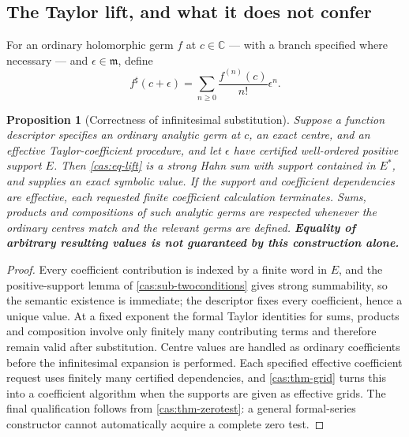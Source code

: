 \documentclass[11pt,letterpaper]{article}
\numberwithin{equation}{section}
\newtheorem{proposition}[theorem]{Proposition}
\theoremstyle{definition}
\theoremstyle{remark}
\newcommand{\C}{\mathbb C}
\newcommand{\mm}{\mathfrak m}
\newcommand{\sh}{^{\sharp}}
\begin{document}
\subsection{The Taylor lift, and what it does not confer}
\label{cas:sub-taylorlift}
For an ordinary holomorphic germ $f$ at $c\in\C$ --- with a branch specified
where necessary --- and $\epsilon\in\mm$, define
\begin{equation}\label{cas:eq-lift}
 f\sh(c+\epsilon)=\sum_{n\ge0}\frac{f^{(n)}(c)}{n!}\epsilon^n .
\end{equation}

\begin{proposition}[Correctness of infinitesimal substitution]\label{cas:prop-lift}
Suppose a function descriptor specifies an ordinary analytic germ at $c$, an
exact centre, and an effective Taylor-coefficient procedure, and let $\epsilon$
have certified well-ordered positive support $E$. Then \eqref{cas:eq-lift} is a
strong Hahn sum with support contained in $E^*$, and supplies an exact symbolic
value. If the support and coefficient dependencies are effective, each requested
finite coefficient calculation terminates. Sums, products and compositions of
such analytic germs are respected whenever the ordinary centres match and the
relevant germs are defined. \textbf{Equality of arbitrary resulting values is
not guaranteed by this construction alone.}
\end{proposition}
\begin{proof}
Every coefficient contribution is indexed by a finite word in $E$, and the
positive-support lemma of \cref{cas:sub-twoconditions} gives strong
summability, so the semantic existence is immediate; the descriptor fixes every
coefficient, hence a unique value. At a fixed exponent the formal Taylor
identities for sums, products and composition involve only finitely many
contributing terms and therefore remain valid after substitution. Centre values
are handled as ordinary coefficients before the infinitesimal expansion is
performed. Each specified effective coefficient request uses finitely many
certified dependencies, and \cref{cas:thm-grid} turns this into a coefficient
algorithm when the supports are given as effective grids. The final
qualification follows from \cref{cas:thm-zerotest}: a general formal-series
constructor cannot automatically acquire a complete zero test.
\end{proof}
\end{document}
